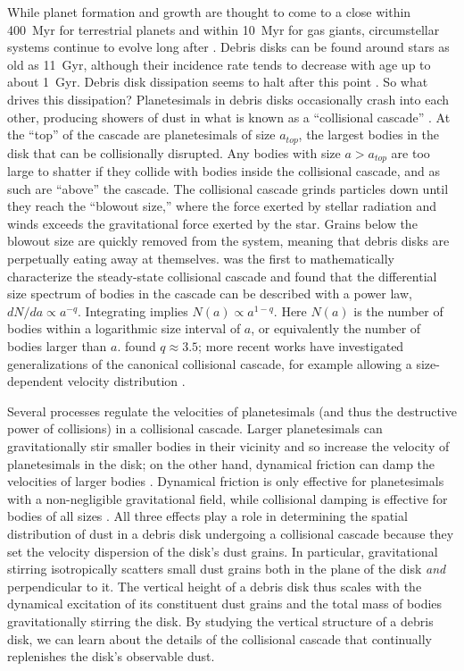 \documentclass[12pt,oneside]{book}
\begin{document}
While planet formation and growth are thought to come to a close within \SI{400}{Myr} for terrestrial planets and within \SI{10}{Myr} for gas giants, circumstellar systems continue to evolve long after \citep{chambers13,d'angelo10}.
Debris disks can be found around stars as old as \SI{11}{Gyr}, although their incidence rate tends to decrease with age up to about \SI{1}{Gyr}. 
Debris disk dissipation seems to halt after this point \citep{sibthorpe18,matthews14}.
So what drives this dissipation?
Planetesimals in debris disks occasionally crash into each other, producing showers of dust in what is known as a ``collisional cascade'' \citep{wyatt2008}.
At the ``top'' of the cascade are planetesimals of size $a_{top}$, the largest bodies in the disk that can be collisionally disrupted.
Any bodies with size $a > a_{top}$ are too large to shatter if they collide with bodies inside the collisional cascade, and as such are ``above'' the cascade.
The collisional cascade grinds particles down until they reach the ``blowout size,'' where the force exerted by stellar radiation and winds exceeds the gravitational force exerted by the star.
Grains below the blowout size are quickly removed from the system, meaning that debris disks are perpetually eating away at themselves.
\cite{dohnanyi} was the first to mathematically characterize the steady-state collisional cascade and found that the differential size spectrum of bodies in the cascade can be described with a power law, $dN/da \propto a^{-q}$.
Integrating implies $N(a) \propto a^{1-q}$.
Here $N(a)$ is the number of bodies within a logarithmic size interval of $a$, or equivalently the number of bodies larger than $a$.
\cite{dohnanyi} found $q \approx 3.5$; more recent works have investigated generalizations of the canonical collisional cascade, for example allowing a size-dependent velocity distribution \citep{pan&schlichting12}.

Several processes regulate the velocities of planetesimals (and thus the destructive power of collisions) in a collisional cascade.
Larger planetesimals can gravitationally stir smaller bodies in their vicinity and so increase the velocity of planetesimals in the disk; on the other hand, dynamical friction can damp the velocities of larger bodies \citep{kenyon&bromley01}.
Dynamical friction is only effective for planetesimals with a non-negligible gravitational field, while collisional damping is effective for bodies of all sizes \citep{kenyon&luu99}.
All three effects play a role in determining the spatial distribution of dust in a debris disk undergoing a collisional cascade because they set the velocity dispersion of the disk's dust grains.
In particular, gravitational stirring isotropically scatters small dust grains both in the plane of the disk \textit{and} perpendicular to it.
The vertical height of a debris disk thus scales with the dynamical excitation of its constituent dust grains and the total mass of bodies gravitationally stirring the disk.
By studying the vertical structure of a debris disk, we can learn about the details of the collisional cascade that continually replenishes the disk's observable dust.
\end{document}
